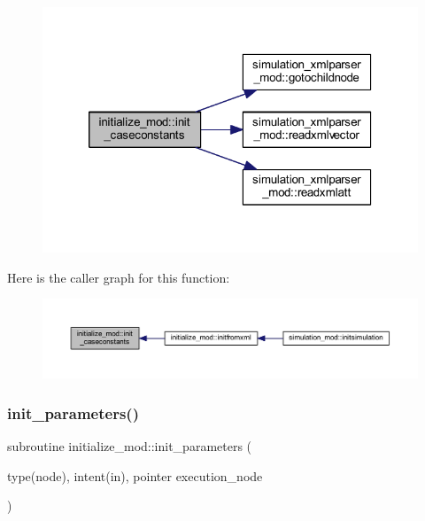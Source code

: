 \begin{figure}[H]
\begin{center}
\leavevmode
\includegraphics[width=320pt]{namespaceinitialize__mod_a9d19665b9ac12c3db8b0842bfdb6fa0c_cgraph}
\end{center}
\end{figure}
Here is the caller graph for this function\+:\nopagebreak
\begin{figure}[H]
\begin{center}
\leavevmode
\includegraphics[width=350pt]{namespaceinitialize__mod_a9d19665b9ac12c3db8b0842bfdb6fa0c_icgraph}
\end{center}
\end{figure}
\mbox{\label{namespaceinitialize__mod_aac9d9dabb797c83e360f9ae60a7e65e3}} 
\subsubsection{\texorpdfstring{init\+\_\+parameters()}{init\_parameters()}}
{\footnotesize\ttfamily subroutine initialize\+\_\+mod\+::init\+\_\+parameters (\begin{DoxyParamCaption}\item[{type(node), intent(in), pointer}]{execution\+\_\+node }\end{DoxyParamCaption})\hspace{0.3cm}{\ttfamily [private]}}



